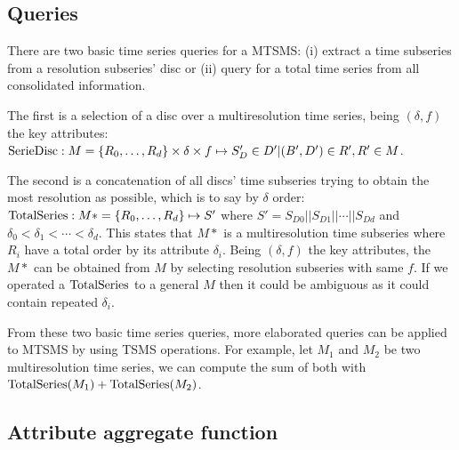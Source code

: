 




\subsection{Queries}


There are two basic time series queries for a MTSMS: (i) extract a
time subseries from a resolution subseries' disc or (ii) query for a
total time series from all consolidated information.

The first is a selection of a disc over a multiresolution time series,
being $(\delta,f)$ the key attributes: $\operatorname{SerieDisc}: M=\{R_0, \dots,
R_d\} \times \delta \times f \mapsto S'_D \in D' | (B',D') \in R',R' \in
M$.

The second is a concatenation of all discs' time subseries trying to
obtain the most resolution as possible, which is to say by $\delta$
order: $\operatorname{TotalSeries}: M*=\{R_0, \dots, R_d\} \mapsto S'$ where $S' =
S_{D0} || S_{D1} || \cdots || S_{Dd}$ and $\delta_0 < \delta_1 <
\cdots < \delta_d$. This states that $M*$ is a multiresolution time
subseries where $R_i$ have a total order by its attribute
$\delta_i$. Being $(\delta,f)$ the key attributes, the $M*$ can
be obtained from $M$ by selecting resolution subseries with same $f$. If we
operated a $\operatorname{TotalSeries}$ to a general $M$ then it could be ambiguous
as it could contain repeated $\delta_i$.


From these two basic time series queries, more elaborated queries can
be applied to MTSMS by using TSMS operations. For example, let $M_1$
and $M_2$ be two multiresolution time series, we can compute the sum
of both with $\operatorname{TotalSeries}(M_1) + \operatorname{TotalSeries}(M_2)$. 





\subsection{Attribute aggregate function}
\label{sec:model:interpolador}

